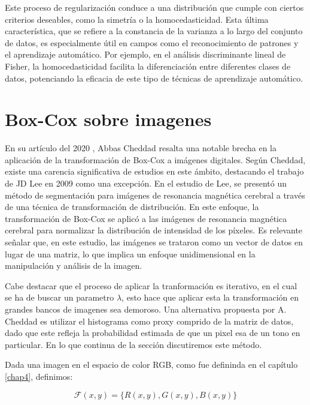     Este proceso de regularizaci\'on conduce a una distribuci\'on que cumple con ciertos criterios deseables, como la simetr\'ia o la homocedasticidad. Esta \'ultima caracter\'istica, que se refiere a la constancia de la varianza a lo largo del conjunto de datos, es especialmente \'util en campos como el reconocimiento de patrones y el aprendizaje autom\'atico. Por ejemplo, en el an\'alisis discriminante lineal de Fisher, la homocedasticidad facilita la diferenciaci\'on entre diferentes clases de datos, potenciando la eficacia de este tipo de t\'ecnicas de aprendizaje autom\'atico.


    \section[]{Box-Cox sobre imagenes} 

    En su art\'iculo del 2020 \cite{boxcoximg}, Abbas Cheddad resalta una notable brecha en la aplicaci\'on de la transformaci\'on de Box-Cox a im\'agenes digitales. Seg\'un Cheddad, existe una carencia significativa de estudios en este \'ambito, destacando el trabajo de JD Lee en 2009 como una excepci\'on\cite{lee2009mr}. En el estudio de Lee, se present\'o un m\'etodo de segmentaci\'on para im\'agenes de resonancia magn\'etica cerebral a trav\'es de una t\'ecnica de transformaci\'on de distribuci\'on. En este enfoque, la transformaci\'on de Box-Cox se aplic\'o a las im\'agenes de resonancia magn\'etica cerebral para normalizar la distribuci\'on de intensidad de los p\'ixeles. Es relevante se\~nalar que, en este estudio, las im\'agenes se trataron como un vector de datos en lugar de una matriz, lo que implica un enfoque unidimensional en la manipulaci\'on y an\'alisis de la imagen.

    Cabe destacar que el proceso de aplicar la tranformaci\'on es iterativo, en el cual se ha de buscar un parametro $\lambda$, esto hace que aplicar esta la transformaci\'on en grandes bancos de imagenes sea demoroso. Una alternativa propuesta por A. Cheddad \cite{boxcoximg} es utilizar el histograma como proxy comprido de la matriz de datos, dado que este refleja la probabilidad estimada de que un pixel esa de un tono en particular. En lo que continua de la secci\'on discutiremos este m\'etodo.

    Dada una imagen en el espacio de color RGB, como fue defininda en el cap\'itulo \ref{chap4}, definimos:
    
    $$
    \mathcal{F}(x, y)=\{R(x, y), G(x, y), B(x, y)\}
    $$

